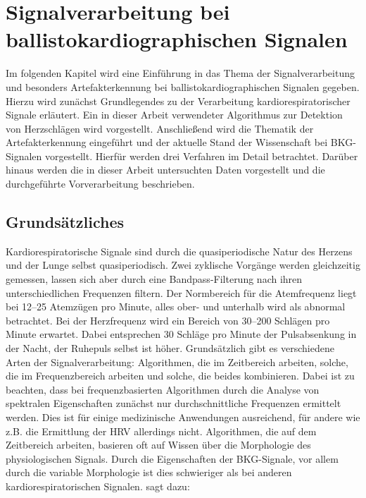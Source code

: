 \chapter{Signalverarbeitung bei ballistokardiographischen Signalen}\label{signalverarbeitung}

Im folgenden Kapitel wird eine Einführung in das Thema der Signalverarbeitung und besonders Artefakterkennung bei ballistokardiographischen Signalen gegeben. Hierzu wird zunächst Grundlegendes zu der Verarbeitung kardiorespiratorischer Signale erläutert. Ein in dieser Arbeit verwendeter Algorithmus zur Detektion von Herzschlägen wird vorgestellt. Anschließend wird die Thematik der Artefakterkennung eingeführt und der aktuelle Stand der Wissenschaft bei \ac{BKG}-Signalen vorgestellt. Hierfür werden drei Verfahren im Detail betrachtet. Darüber hinaus werden die in dieser Arbeit untersuchten Daten vorgestellt und die durchgeführte Vorverarbeitung beschrieben.

\section{Grundsätzliches} %

	Kardiorespiratorische Signale sind durch die quasiperiodische Natur des Herzens und der Lunge selbst quasiperiodisch. Zwei zyklische Vorgänge werden gleichzeitig gemessen, lassen sich aber durch eine Bandpass-Filterung nach ihren unterschiedlichen Frequenzen filtern. Der Normbereich für die Atemfrequenz liegt bei \numrange{12}{25} Atemzügen pro Minute, alles ober- und unterhalb wird als abnormal betrachtet. Bei der Herzfrequenz wird ein Bereich von \numrange{30}{200} Schlägen pro Minute erwartet. Dabei entsprechen 30 Schläge pro Minute der Pulsabsenkung in der Nacht, der Ruhepuls selbst ist höher. Grundsätzlich gibt es verschiedene Arten der Signalverarbeitung: Algorithmen, die im Zeitbereich arbeiten, solche, die im Frequenzbereich arbeiten und solche, die beides kombinieren. Dabei ist zu beachten, dass bei frequenzbasierten Algorithmen durch die Analyse von spektralen Eigenschaften zunächst nur durchschnittliche Frequenzen ermittelt werden. Dies ist für einige medizinische Anwendungen ausreichend, für andere wie z.B. die Ermittlung der \ac{HRV} allerdings nicht. Algorithmen, die auf dem Zeitbereich arbeiten, basieren oft auf Wissen über die Morphologie des physiologischen Signals. Durch die Eigenschaften der \ac{BKG}-Signale, vor allem durch die variable Morphologie ist dies schwieriger als bei anderen kardiorespiratorischen Signalen. %
	\citeauthor{Paalasmaa2015} sagt dazu:

